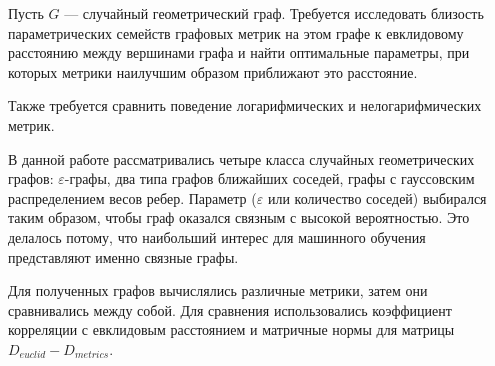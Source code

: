 Пусть $G$ --- случайный геометрический граф. Требуется исследовать близость параметрических семейств графовых метрик на этом графе к евклидовому расстоянию между вершинами графа и найти оптимальные параметры, при которых метрики наилучшим образом приближают это расстояние.

Также требуется сравнить поведение логарифмических и нелогарифмических метрик.

В данной работе рассматривались четыре класса случайных геометрических графов: $\varepsilon$-графы, два типа графов ближайших соседей, графы с гауссовским распределением весов ребер. Параметр ($\varepsilon$ или количество соседей) выбирался таким образом, чтобы граф оказался связным с высокой вероятностью. Это делалось потому, что наибольший интерес для машинного обучения представляют именно связные графы.

Для полученных графов вычислялись различные метрики, затем они сравнивались между собой. Для сравнения использовались коэффициент корреляции с евклидовым расстоянием и матричные нормы для матрицы $D_{euclid} - D_{metrics}$.




\clearpage

